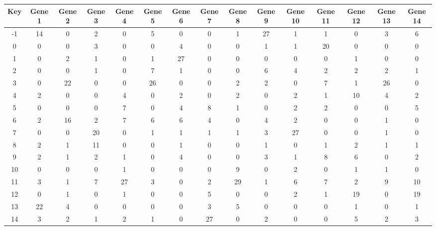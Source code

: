 \begin{tabular}{|c|c|c|c|c|c|c|c|c|c|c|c|c|c|c|}
\hline
Key & Gene 1 & Gene 2 & Gene 3 & Gene 4 & Gene 5 & Gene 6 & Gene 7 & Gene 8 & Gene 9 & Gene 10 & Gene 11 & Gene 12 & Gene 13 & Gene 14 \\
\hline
-1 & 14 & 0 & 2 & 0 & 5 & 0 & 0 & 1 & 27 & 1 & 1 & 0 & 3 & 6 \\
0 & 0 & 0 & 3 & 0 & 0 & 4 & 0 & 0 & 1 & 1 & 20 & 0 & 0 & 0 \\
1 & 0 & 2 & 1 & 0 & 1 & 27 & 0 & 0 & 0 & 0 & 0 & 1 & 0 & 0 \\
2 & 0 & 0 & 1 & 0 & 7 & 1 & 0 & 0 & 6 & 4 & 2 & 2 & 2 & 1 \\
3 & 0 & 22 & 0 & 0 & 26 & 0 & 0 & 2 & 2 & 0 & 7 & 1 & 26 & 0 \\
4 & 2 & 0 & 0 & 4 & 0 & 2 & 0 & 2 & 0 & 2 & 1 & 10 & 4 & 2 \\
5 & 0 & 0 & 0 & 7 & 0 & 4 & 8 & 1 & 0 & 2 & 2 & 0 & 0 & 5 \\
6 & 2 & 16 & 2 & 7 & 6 & 6 & 4 & 0 & 4 & 2 & 0 & 0 & 1 & 0 \\
7 & 0 & 0 & 20 & 0 & 1 & 1 & 1 & 1 & 3 & 27 & 0 & 0 & 1 & 0 \\
8 & 2 & 1 & 11 & 0 & 0 & 1 & 0 & 0 & 1 & 0 & 1 & 2 & 1 & 1 \\
9 & 2 & 1 & 2 & 1 & 0 & 4 & 0 & 0 & 3 & 1 & 8 & 6 & 0 & 2 \\
10 & 0 & 0 & 0 & 1 & 0 & 0 & 0 & 9 & 0 & 2 & 0 & 1 & 1 & 0 \\
11 & 3 & 1 & 7 & 27 & 3 & 0 & 2 & 29 & 1 & 6 & 7 & 2 & 9 & 10 \\
12 & 0 & 1 & 0 & 1 & 0 & 0 & 5 & 0 & 0 & 2 & 1 & 19 & 0 & 19 \\
13 & 22 & 4 & 0 & 0 & 0 & 0 & 3 & 5 & 0 & 0 & 0 & 1 & 0 & 1 \\
14 & 3 & 2 & 1 & 2 & 1 & 0 & 27 & 0 & 2 & 0 & 0 & 5 & 2 & 3 \\
\hline
\end{tabular}